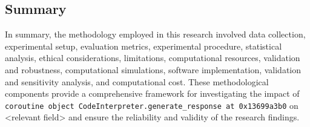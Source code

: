 \documentclass{article}
\begin{document}
\subsection{Summary}

In summary, the methodology employed in this research involved data collection, experimental setup, evaluation metrics, experimental procedure, statistical analysis, ethical considerations, limitations, computational resources, validation and robustness, computational simulations, software implementation, validation and sensitivity analysis, and computational cost. These methodological components provide a comprehensive framework for investigating the impact of \texttt{coroutine object CodeInterpreter.generate\_response at 0x13699a3b0} on <relevant field> and ensure the reliability and validity of the research findings.
\end{document}
